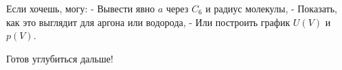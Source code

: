 \documentclass[11pt]{article}
\makeatletter
\newcommand{\boxspacing}{\kern\kvtcb@left@rule\kern\kvtcb@boxsep}
\newcommand{\prompt}[4]{
        {\ttfamily\llap{{\color{#2}[#3]:\hspace{3pt}#4}}\vspace{-\baselineskip}}
    }
\makeatother
\begin{document}
Если хочешь, могу: - Вывести явно \(a\) через \(C_6\) и радиус молекулы,
- Показать, как это выглядит для аргона или водорода, - Или построить
график \(U(V)\) и \(p(V)\).

Готов углубиться дальше!

    \begin{tcolorbox}[breakable, size=fbox, boxrule=1pt, pad at break*=1mm,colback=cellbackground, colframe=cellborder]
\prompt{In}{incolor}{ }{\boxspacing}
\begin{Verbatim}[commandchars=\\\{\}]

\end{Verbatim}
\end{tcolorbox}


    
    
    
\end{document}
